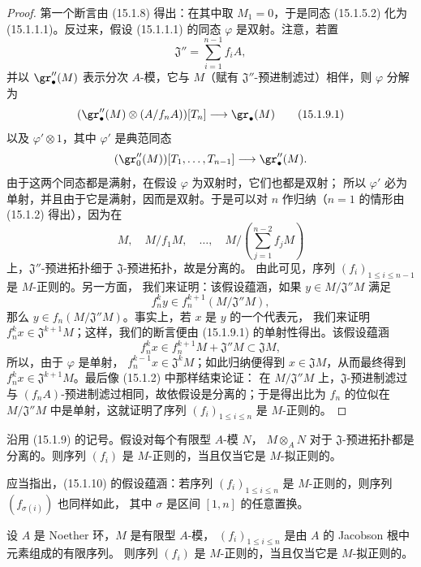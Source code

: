\begin{proof}
第一个断言由 (15.1.8) 得出：在其中取 $M_1=0$，于是同态
(15.1.5.2) 化为 (15.1.1.1)。反过来，假设 (15.1.1.1) 的同态
$\varphi$ 是双射。注意，若置
\[
  \mathfrak{J}''=\sum_{i=1}^{n-1}f_iA,
\]
并以 $\gr''_\bullet(M)$ 表示分次 $A$-模，它与 $M$（赋有
$\mathfrak{J}''$-预进制滤过）相伴，则 $\varphi$ 分解为
\[
  (\gr''_\bullet(M)\otimes(A/f_nA))[T_n]\longrightarrow\gr_\bullet(M)
  \tag{15.1.9.1}\label{0.15.1.9.1-fr}
\]
以及 $\varphi'\otimes1$，其中 $\varphi'$ 是典范同态
\[
  (\gr''_0(M))[T_1,\ldots,T_{n-1}]
  \longrightarrow\gr''_\bullet(M).
\]
由于这两个同态都是满射，在假设 $\varphi$ 为双射时，它们也都是双射；
所以 $\varphi'$ 必为单射，并且由于它是满射，因而是双射。于是可以对 $n$
作归纳（$n=1$ 的情形由 (15.1.2) 得出），因为在
\[
  M,\quad M/f_1M,\quad\ldots,\quad
  M/\left(\sum_{j=1}^{n-2}f_jM\right)
\]
上，$\mathfrak{J}''$-预进拓扑细于 $\mathfrak{J}$-预进拓扑，故是分离的。
由此可见，序列 $(f_i)_{1\leq i\leq n-1}$ 是 $M$-正则的。另一方面，
我们来证明：该假设蕴涵，如果 $y\in M/\mathfrak{J}''M$ 满足
\[
  f_n^ky\in f_n^{k+1}(M/\mathfrak{J}''M),
\]
那么 $y\in f_n(M/\mathfrak{J}''M)$。事实上，若 $x$ 是 $y$ 的一个代表元，
我们来证明 $f_n^kx\in\mathfrak{J}^{k+1}M$；这样，我们的断言便由
(15.1.9.1) 的单射性得出。该假设蕴涵
\[
  f_n^kx\in f_n^{k+1}M+\mathfrak{J}''M\subset\mathfrak{J}M,
\]
所以，由于 $\varphi$ 是单射，
$f_n^{k-1}x\in\mathfrak{J}^kM$；如此归纳便得到
$x\in\mathfrak{J}M$，从而最终得到
$f_n^kx\in\mathfrak{J}^{k+1}M$。最后像 (15.1.2) 中那样结束论证：
在 $M/\mathfrak{J}''M$ 上，$\mathfrak{J}$-预进制滤过与
$(f_nA)$-预进制滤过相同，故依假设是分离的；于是得出比为 $f_n$ 的位似在
$M/\mathfrak{J}''M$ 中是单射，这就证明了序列
$(f_i)_{1\leq i\leq n}$ 是 $M$-正则的。
\end{proof}

\begin{corollary}[15.1.10]
\label{0.15.1.10-fr}
沿用 (15.1.9) 的记号。假设对每个有限型 $A$-模 $N$，
$M\otimes_A N$ 对于 $\mathfrak{J}$-预进拓扑都是分离的。则序列
$(f_i)$ 是 $M$-正则的，当且仅当它是 $M$-拟正则的。
\end{corollary}

应当指出，(15.1.10) 的假设蕴涵：若序列
$(f_i)_{1\leq i\leq n}$ 是 $M$-正则的，则序列 $(f_{\sigma(i)})$ 也同样如此，
其中 $\sigma$ 是区间 $[1,n]$ 的任意置换。

\begin{corollary}[15.1.11]
\label{0.15.1.11-fr}
设 $A$ 是 Noether 环，$M$ 是有限型 $A$-模，
$(f_i)_{1\leq i\leq n}$ 是由 $A$ 的 Jacobson 根中元素组成的有限序列。
则序列 $(f_i)$ 是 $M$-正则的，当且仅当它是 $M$-拟正则的。
\end{corollary}

